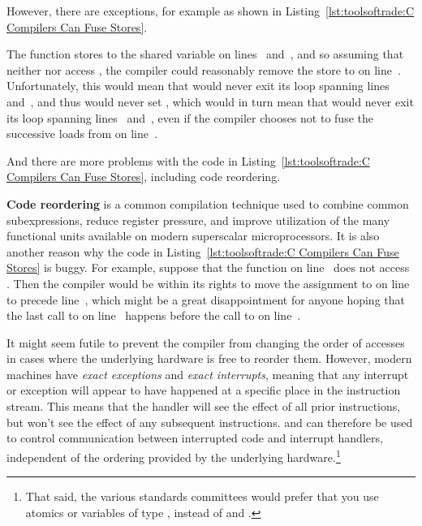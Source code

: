 However, there are exceptions, for example as shown in
Listing~\ref{lst:toolsoftrade:C Compilers Can Fuse Stores}.
\begin{fcvref}
The function  stores to the shared
variable  on lines~ and~,
and so assuming that neither
 nor  access ,
the compiler could reasonably remove the store to  on
line~.
Unfortunately, this would mean that  would
never exit its loop spanning
lines~ and~, and thus would never set
, which would in turn mean that 
would never exit its loop spanning
lines~ and~, even if
the compiler chooses not to fuse the successive loads from
 on line~.

And there are more problems with the code in
Listing~\ref{lst:toolsoftrade:C Compilers Can Fuse Stores},
including code reordering.

{\bf Code reordering} is a common compilation technique used to
combine common subexpressions, reduce register pressure, and
improve utilization of the many functional units available on
modern superscalar microprocessors.
It is also another reason why the code in
Listing~\ref{lst:toolsoftrade:C Compilers Can Fuse Stores}
is buggy.
For example, suppose that the  function on
line~
does not access .
Then the compiler would be within its rights to move the assignment
to  on
line~ to precede line~, which might
be a great disappointment for anyone hoping that the last call to
 on line~ happens before the call to
 on line~.
\end{fcvref}

It might seem futile to prevent the compiler from changing the order of
accesses in cases where the underlying hardware is free to reorder them.
However, modern machines have \emph{exact exceptions} and
\emph{exact interrupts}, meaning that any interrupt or exception will
appear to have happened at a specific place in the instruction
stream.
This means that the handler will see the effect of all prior
instructions, but won't see the effect of any subsequent instructions.
 and  can therefore be used to
control communication between interrupted code and interrupt handlers,
independent of the ordering provided by the underlying hardware.\footnote{
	That said, the various standards committees would prefer that
	you use atomics or variables of type , instead
	of  and .}

